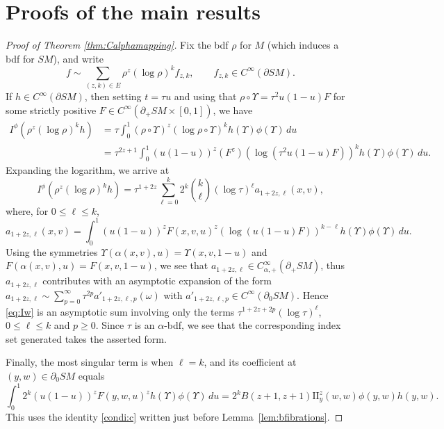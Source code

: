 \documentclass[JEP,XML,SOM,Unicode,NoFloatCountersInSection, NoEqCountersInSection,published]{cedram}
\theoremstyle{plain}
\theoremstyle{definition}
\theoremstyle{remark}
\def\two{\mathrm{II}}
\newcommand{\del}{\partial}
\begin{document}
\section{Proofs of the main results} \label{sec:proofmain}

 \label{sec:proofmainXray}

\begin{proof}[Proof of Theorem \ref{thm:Calphamapping}] Fix the bdf $\rho$ for $M$ (which induces a bdf for $SM$), and write\vspace*{-3pt}
\begin{equation*}
f \sim \sum_{(z,k)\in E} \rho^z (\log \rho)^k f_{z,k}, \qquad f_{z,k}\in C^\infty(\partial SM).
\end{equation*}
If $h \in C^\infty(\partial SM)$, then setting $t = \tau u$ and using that $\rho\circ \Upsilon = \tau^2 u(1-u) F$ for
some strictly positive $F\in C^\infty(\partial_+ SM \times [0,1])$, we have\vspace*{-3pt}\enlargethispage{1\baselineskip}
\begin{align*}
I^\phi (\rho^z (\log \rho)^k h) &= \tau \int_0^1 (\rho\circ\Upsilon)^z (\log \rho\circ \Upsilon)^k h(\Upsilon) \phi(\Upsilon)\,du \\[-3pt]
&= \tau^{2z + 1} \int_0^1 (u(1-u))^z (F^z) (\log (\tau^2 u(1-u) F))^k h(\Upsilon) \phi(\Upsilon)\,du.
\end{align*}
Expanding the logarithm, we arrive at\vspace*{-5pt}
\begin{equation}
I^\phi (\rho^z (\log \rho)^k h) = \tau^{1+2z} \sum_{\ell=0}^k 2^k \binom{k}{\ell} (\log \tau)^\ell a_{1+2z, \ell}(x,v),
\label{eq:Iw}
\end{equation}
where, for $0\le \ell\le k$,\vspace*{-5pt}
\begin{equation*}
a_{1+2z, \ell}(x,v) = \int_0^1 (u(1-u))^z F(x,v,u)^z (\log(u(1-u)F))^{k-\ell} h(\Upsilon) \phi(\Upsilon)\,du.
\end{equation*}
Using the symmetries $\Upsilon(\alpha(x,v), u) = \Upsilon(x,v,1-u)$ and $F(\alpha(x,v),u) = F(x,v,1-u)$, we see that
$a_{1+2z,\ell} \in C^\infty_{\alpha,+}(\partial_{+}SM)$, thus $a_{1+2z,\ell}$ contributes with an asymptotic expansion of the form $a_{1+2z,\ell} \sim \sum_{p=0}^\infty \tau^{2p} a'_{1+2z,\ell,p}(\omega)$ with $a'_{1+2z,\ell,p}\in C^\infty(\partial_0 SM)$. Hence \eqref{eq:Iw} is an asymptotic sum involving only the terms $\tau^{1+2z+2p}(\log \tau)^\ell$, $0\le \ell\le k$ and $p\ge 0$. Since $\tau$ is an $\alpha$-bdf, we see that the corresponding index set generated takes the asserted form.

Finally, the most singular term is when $\ell = k$, and its coefficient at $(y,w) \in \del_0 SM$ equals\vspace*{-3pt}
\[
\int_0^1 \!\! 2^k (u(1-u))^z F(y,w,u)^z h(\Upsilon) \phi(\Upsilon)\, du = 2^k B(z+1, z+1) \two_y^z(w, w) \phi(y,w) h(y,w) .
\]
This uses the identity \eqref{condi:c} written just before Lemma~\ref{lem:bfibrations}.
\end{proof}
\end{document}
